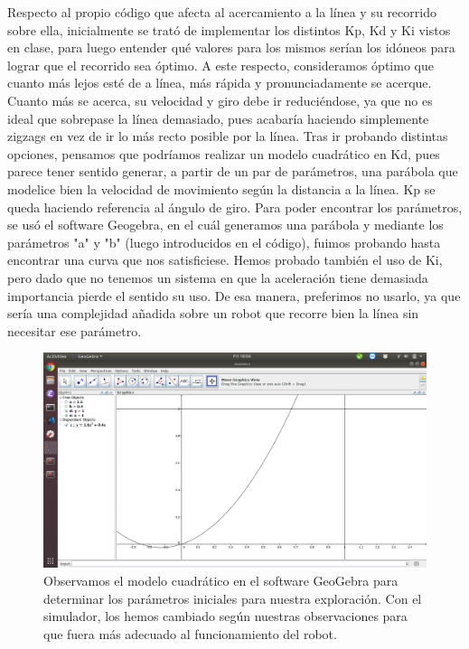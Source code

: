 \documentclass{article}
\begin{document}
Respecto al propio código que afecta al acercamiento a la línea y su recorrido sobre ella, inicialmente se trató de implementar los distintos Kp, Kd y Ki vistos en clase, para luego entender qué valores para los mismos serían los idóneos para lograr que el recorrido sea óptimo. A este respecto, consideramos óptimo que cuanto más lejos esté de a línea, más rápida y pronunciadamente se acerque. Cuanto más se acerca, su velocidad y giro debe ir reduciéndose, ya que no es ideal que sobrepase la línea demasiado, pues acabaría haciendo simplemente zigzags en vez de ir lo más recto posible por la línea. Tras ir probando distintas opciones, pensamos que podríamos realizar un modelo cuadrático en Kd, pues parece tener sentido generar, a partir de un par de parámetros, una parábola que modelice bien la velocidad de movimiento según la distancia a la línea. Kp se queda haciendo referencia al ángulo de giro. Para poder encontrar los parámetros, se usó el software Geogebra, en el cuál generamos una parábola y mediante los parámetros "a" y "b" (luego introducidos en el código), fuimos probando hasta encontrar una curva que nos satisficiese. Hemos probado también el uso de Ki, pero dado que no tenemos un sistema en que la aceleración tiene demasiada importancia pierde el sentido su uso. De esa manera, preferimos no usarlo, ya que sería una complejidad añadida sobre un robot que recorre bien la línea sin necesitar ese parámetro.


\begin{figure}[H]
    \centering
    \includegraphics[width=12cm]{modeloCuadratico.png}
    \caption{Observamos el modelo cuadrático en el software GeoGebra para determinar los parámetros iniciales para nuestra exploración. Con el simulador, los hemos cambiado según nuestras observaciones para que fuera más adecuado al funcionamiento del robot.}
    \label{fig:modeloCuadratico}
\end{figure}
\end{document}
